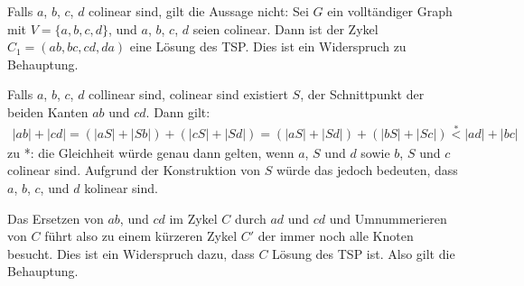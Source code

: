 \documentclass[a4paper]{article}
\begin{document}
	Falls $a$, $b$, $c$, $d$ colinear sind, gilt die Aussage nicht:
	Sei $G$ ein volltändiger Graph mit $V = \{a,b,c,d\}$, und $a$, $b$, $c$, $d$ seien colinear. Dann ist der Zykel $C_1 = (ab,bc,cd,da)$ eine Lösung des TSP. Dies ist ein Widerspruch zu Behauptung.
	
	Falls $a$, $b$, $c$, $d$ collinear sind, colinear sind existiert $S$, der Schnittpunkt der beiden Kanten $ab$ und $cd$. Dann 	gilt:
	\begin{align*}
		|ab|+|cd| = (|aS| + |Sb|) + (|cS| + |Sd|) = (|aS| + |Sd|) + (|bS| + |Sc|) \stackrel*< |ad| + |bc|
	\end{align*}
	zu *: die Gleichheit würde genau dann gelten, wenn $a$, $S$ und $d$ sowie $b$, $S$ und $c$ colinear sind. Aufgrund der Konstruktion von $S$ würde das jedoch bedeuten, dass $a$, $b$, $c$, und $d$ kolinear sind. 
	
	Das Ersetzen von $ab$, und $cd$ im Zykel $C$ durch $ad$ und $cd$ und Umnummerieren von $C$ führt also zu einem kürzeren Zykel $C'$ der immer noch alle Knoten besucht. Dies ist ein Widerspruch dazu, dass $C$ Lösung des TSP ist. Also gilt die Behauptung.
\end{document}
